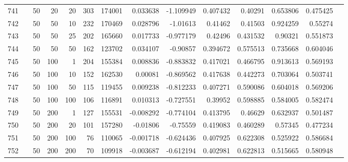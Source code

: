 \begin{longtable}{llrrrrrrrrrrrr}
		741 & &           50 &                20 &           20 &         303 &     174001 &  0.033638 & -1.109949 &  0.407432 &     0.40291 &       0.653806 &  0.475425 \\
		742 & &           50 &                50 &           10 &         232 &     170469 &  0.028796 &  -1.01613 &   0.41462 &     0.41503 &       0.924259 &   0.55274 \\
		743 & &           50 &                50 &           25 &         202 &     165660 &  0.017733 & -0.977179 &   0.42496 &    0.431532 &        0.90321 &  0.551873 \\
		744 & &           50 &                50 &           50 &         162 &     123702 &  0.034107 &  -0.90857 &  0.394672 &    0.575513 &       0.735668 &  0.604046 \\
		745 & &           50 &               100 &            1 &         204 &     155384 &  0.008836 & -0.883832 &  0.417021 &    0.466795 &       0.913613 &  0.569193 \\
		746 & &           50 &               100 &           10 &         152 &     162530 &   0.00081 & -0.869562 &  0.417638 &    0.442273 &       0.703064 &  0.503741 \\
		747 & &           50 &               100 &           50 &         115 &     119455 &  0.009238 & -0.812233 &  0.407271 &    0.590086 &       0.604018 &  0.569206 \\
		748 & &           50 &               100 &          100 &         106 &     116891 &  0.010313 & -0.727551 &   0.39952 &    0.598885 &       0.584005 &  0.582474 \\
		749 & &           50 &               200 &            1 &         127 &     155531 & -0.008292 & -0.774104 &  0.413795 &     0.46629 &       0.632937 &  0.501487 \\
		750 & &           50 &               200 &           20 &         101 &     157280 &  -0.01806 &  -0.75559 &  0.419083 &    0.460289 &        0.57345 &  0.477234 \\
		751 & &           50 &               200 &          100 &          76 &     110065 & -0.001718 & -0.624436 &  0.407925 &    0.622308 &       0.525922 &  0.586684 \\
		752 & &           50 &               200 &          200 &          70 &     109918 & -0.003687 & -0.612194 &  0.402981 &    0.622813 &       0.515665 &  0.580948 \\
	\end{longtable}
\normalsize